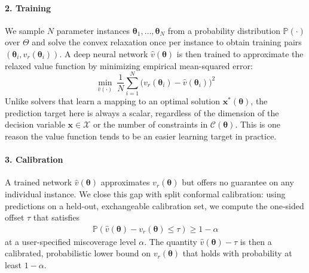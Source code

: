 \documentclass[10pt]{article} %
\theoremstyle{plain}
\theoremstyle{definition}
\theoremstyle{remark}
\begin{document}
\begin{tcolorbox}
\paragraph{2. Training} We sample $N$ parameter instances $\bm{\theta}_1, \ldots, \bm{\theta}_N$ from a probability distribution $\mathbb{P}(\cdot)$ over $\Theta$ and solve the convex relaxation once per instance to obtain training pairs $(\bm{\theta}_i, v_r(\bm{\theta}_i))$. A deep neural network $\hat{v}(\bm{\theta})$ is then trained to approximate the relaxed value function by minimizing empirical mean-squared error:
\begin{equation*}
    \min_{\hat{v}(\cdot)}~ \frac{1}{N} \sum_{i=1}^N \big(v_r(\bm{\theta}_i) - \hat{v}(\bm{\theta}_i)\big)^2
\end{equation*}
Unlike solvers that learn a mapping to an optimal solution $\mathbf{x}^*(\bm{\theta})$, the prediction target here is always a scalar, regardless of the dimension of the decision variable $\mathbf{x} \in \mathcal{X}$ or the number of constraints in $\mathcal{C}(\bm{\theta})$. This is one reason the value function tends to be an easier learning target in practice.
\\
\paragraph{3. Calibration} A trained network $\hat{v}(\bm{\theta})$ approximates $v_r(\bm{\theta})$ but offers no guarantee on any individual instance. We close this gap with split conformal calibration: using predictions on a held-out, exchangeable calibration set, we compute the one-sided offset $\tau$ that satisfies
\begin{align*}
    \mathbb{P}(\hat{v}(\bm{\theta}) - v_r(\bm{\theta}) \leq \tau ) \geq 1 - \alpha
\end{align*} at a user-specified miscoverage level $\alpha$. The quantity $\hat{v}(\bm{\theta}) - \tau$ is then a calibrated, probabilistic lower bound on $v_r(\bm{\theta})$ that holds with probability at least $1 - \alpha$.
\\

\end{tcolorbox}
\end{document}
